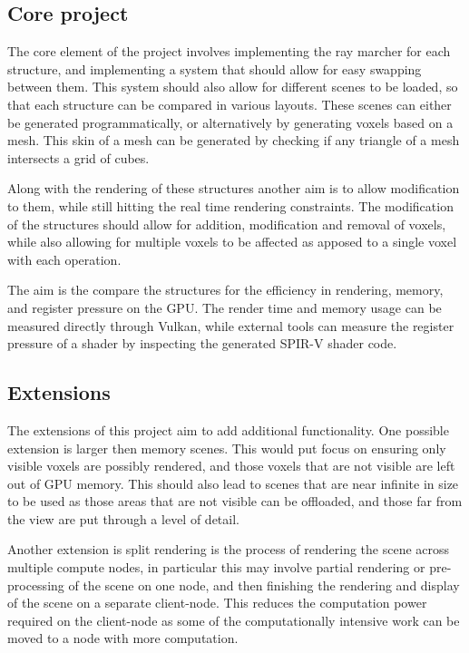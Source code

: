 \subsection*{Core project}
The core element of the project involves implementing the ray marcher
for each structure, and implementing a system that should allow
for easy swapping between them. This system should also allow for different
scenes to be loaded, so that each structure can be compared in various layouts.
These scenes can either be generated programmatically, or
alternatively by generating voxels based on a mesh. This skin of a mesh can
be generated by checking if any triangle of a mesh intersects a grid of cubes.

Along with the rendering of these structures another aim is to allow
modification to them, while still hitting the real time rendering constraints.
The modification of the structures should allow for addition, modification and
removal of voxels, while also allowing for multiple voxels to be
affected as apposed to a single voxel with each operation.

The aim is the compare the structures for the efficiency in
rendering, memory, and register pressure
on the GPU. The render time and memory usage can be measured directly
through Vulkan, while external tools can measure the register
pressure of a shader by inspecting the generated SPIR-V shader code.

\subsection*{Extensions}
The extensions of this project aim to add additional functionality. One possible
extension is larger then memory scenes. This would put focus on ensuring only
visible voxels are possibly rendered, and those voxels that are not visible
are left out of GPU memory. This should also lead to scenes that are
near infinite in size to be used as those areas that are not visible can
be offloaded, and those far from the view are put through a level of detail.

Another extension is split rendering is the process of rendering the
scene across multiple compute nodes, in particular this may involve
partial rendering or pre-processing of the scene on one node, and
then finishing the rendering and display of the scene on a separate
client-node. This reduces the computation power required on the
client-node as some of the computationally intensive work can be
moved to a node with more computation.
